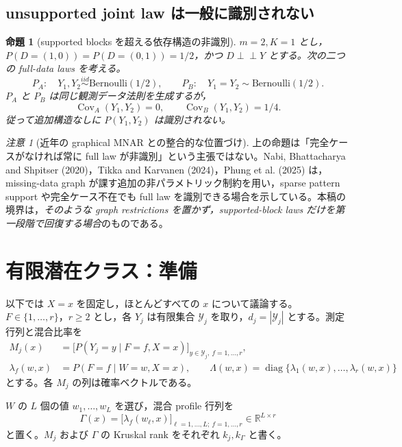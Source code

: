 \documentclass[11pt,a4paper]{ltjsarticle}
\newtheorem{proposition}{命題}[section]
\theoremstyle{remark}\newtheorem{remark}{注意}[section]
\newcommand{\ind}{\perp\!\!\!\perp}
\newcommand{\R}{\mathbb R}
\newcommand{\cY}{\mathcal Y}
\newcommand{\diag}{\operatorname{diag}}
\begin{document}
\subsection{unsupported joint law は一般に識別されない}
\begin{proposition}[supported blocks を超える依存構造の非識別]\label{prop:unsupported}
$m=2,K=1$ とし，$P(D=(1,0))=P(D=(0,1))=1/2$，かつ $D\ind Y$ とする。次の二つの full-data laws を考える。
\[
P_A:\quad Y_1,Y_2\stackrel{iid}{\sim}\mathrm{Bernoulli}(1/2),
\qquad
P_B:\quad Y_1=Y_2\sim\mathrm{Bernoulli}(1/2).
\]
$P_A$ と $P_B$ は同じ観測データ法則を生成するが，
\[
\operatorname{Cov}_A(Y_1,Y_2)=0,
\qquad
\operatorname{Cov}_B(Y_1,Y_2)=1/4.
\]
従って追加構造なしに $P(Y_1,Y_2)$ は識別されない。
\end{proposition}

\begin{remark}[近年の graphical MNAR との整合的な位置づけ]
上の命題は「完全ケースがなければ常に full law が非識別」という主張ではない。Nabi, Bhattacharya and Shpitser (2020)，Tikka and Karvanen (2024)，Phung et al. (2025) は，missing-data graph が課す追加の非パラメトリック制約を用い，sparse pattern support や完全ケース不在でも full law を識別できる場合を示している。本稿の境界は，\emph{そのような graph restrictions を置かず，supported-block laws だけを第一段階で回復する場合}のものである。
\end{remark}

\section{有限潜在クラス：準備}

以下では $X=x$ を固定し，ほとんどすべての $x$ について議論する。$F\in\{1,\ldots,r\}$，$r\ge2$ とし，各 $Y_j$ は有限集合 $\cY_j$ を取り，$d_j=|\cY_j|$ とする。測定行列と混合比率を
\begin{align*}
M_j(x)&=\big[P(Y_j=y\mid F=f,X=x)\big]_{y\in\cY_j,\ f=1,\ldots,r},\\
\lambda_f(w,x)&=P(F=f\mid W=w,X=x),\qquad
\Lambda(w,x)=\diag\{\lambda_1(w,x),\ldots,\lambda_r(w,x)\}
\end{align*}
とする。各 $M_j$ の列は確率ベクトルである。

$W$ の $L$ 個の値 $w_1,\ldots,w_L$ を選び，混合 profile 行列を
\begin{equation}
\Gamma(x)=\big[\lambda_f(w_\ell,x)\big]_{\ell=1,\ldots,L;\ f=1,\ldots,r}\in\R^{L\times r}\label{eq:Gamma}
\end{equation}
と置く。$M_j$ および $\Gamma$ の Kruskal rank をそれぞれ $k_j,k_\Gamma$ と書く。
\end{document}

